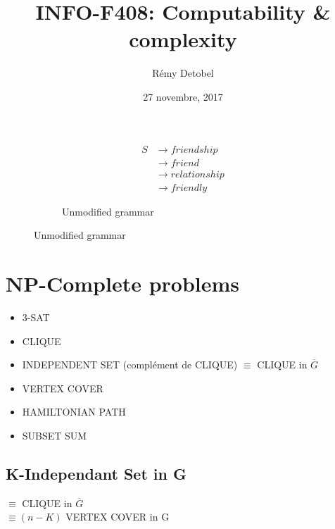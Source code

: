 \documentclass[a4paper,12pt]{article}
\title{INFO-F408: Computability \& complexity}
\date{27 novembre, 2017}
\author{Rémy Detobel}
\begin{document}
\maketitle
\newpage

\begin{figure}[h!]
  \begin{subfigure}[b]{0.4\textwidth}
      \centering
      \begin{align}
	S &\rightarrow friendship \\
	  &\rightarrow friend \\
	  &\rightarrow relationship \\
	  &\rightarrow friendly
      \end{align}
      \caption{Unmodified grammar}
      \label{fig:unmodifiedgrammar1}
  \end{subfigure}%
\end{figure}



\section{NP-Complete problems}
  \begin{itemize}
    \item 3-SAT
    \item CLIQUE
    \item INDEPENDENT SET (complément de CLIQUE) $\equiv$ CLIQUE in $\overline{G}$
    \item VERTEX COVER
    \item HAMILTONIAN PATH
    \item SUBSET SUM
  \end{itemize}

  \subsection{K-Independant Set in G}
    $\equiv$ CLIQUE in $\overline{G}$\\
    $\equiv (n-K)$ VERTEX COVER in G
\end{document}
